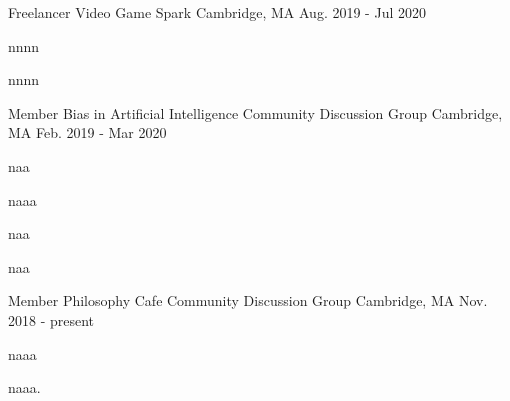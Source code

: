 \begin{cventries}
  \cventry
    {Freelancer}
    {Video Game Spark}
    {Cambridge, MA}
    {Aug. 2019 - Jul 2020}
    {
      \begin{cvitems}
        \item {nnnn}
        \item {nnnn}
      \end{cvitems}
    }
  \cventry
    {Member}
    {Bias in Artificial Intelligence Community Discussion Group}
    {Cambridge, MA}
    {Feb. 2019 - Mar 2020}
    {
      \begin{cvitems}
        \item {naa}
        \item {naaa}
        \item {naa}
        \item {naa}
      \end{cvitems}
    }
  \cventry
    {Member}
    {Philosophy Cafe Community Discussion Group}
    {Cambridge, MA}
    {Nov. 2018 - present}
    {
      \begin{cvitems}
        \item {naaa}
        \item {naaa.}
      \end{cvitems}
    }
\end{cventries}
